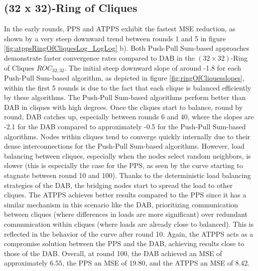 \subsection{(32 x 32)-Ring of Cliques}\label{subsec:32_32ROC}
In the early rounds, PPS and ATPPS exhibit the fastest MSE reduction, as shown by a very steep downward trend between rounds 1 and 5 in figure \ref{fig:atppsRingOfCliquesLog_LogLog} b). Both Push-Pull Sum-based approaches demonstrate faster convergence rates compared to DAB in the $(32\times 32)$-Ring of Cliques $ROC_{32,32}$. The initial steep downward slope of around -1.8 for each Push-Pull Sum-based algorithm, as depicted in figure \ref{fig:ringOfCliquesslopes}, within the first 5 rounds is due to the fact that each clique is balanced efficiently by these algorithms. The Push-Pull Sum-based algorithms perform better than DAB in cliques with high degrees. Once the cliques start to balance, round by round, DAB catches up, especially between rounds 6 and 40, where the slopes are -2.1 for the DAB compared to approximately -0.5 for the Push-Pull Sum-based algorithms. Nodes within cliques tend to converge quickly internally due to their dense interconnections for the Push-Pull Sum-based algorithms. However, load balancing between cliques, especially when the nodes select random neighbors, is slower (this is especially the case for the PPS, as seen by the curve starting to stagnate between round 10 and 100). Thanks to the deterministic load balancing strategies of the DAB, the bridging nodes start to spread the load to other cliques. The ATPPS achieves better results compared to the PPS since it has a similar mechanism in this scenario like the DAB, prioritizing communication between cliques (where differences in loads are more significant) over redundant communication within cliques (where loads are already close to balanced). This is reflected in the behavior of the curve after round 10. Again, the ATPPS acts as a compromise solution between the PPS and the DAB, achieving results close to those of the DAB. Overall, at round 100, the DAB achieved an MSE of approximately $6.55$, the PPS an MSE of 19.80, and the ATPPS an MSE of 8.42.

